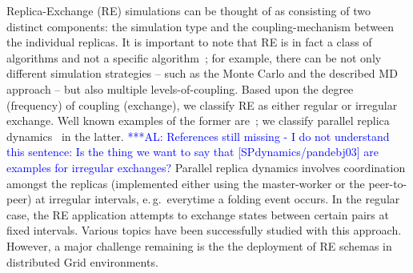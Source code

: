 \documentclass[times, 10pt, twocolumn]{article}
\newcommand{\alnote}[1]{ {\textcolor{blue} { ***AL: #1 }}}
\newcommand{\alnote}[1]{}
\begin{document}
Replica-Exchange (RE) simulations can be thought of as consisting of
two distinct components: the simulation type and the
coupling-mechanism between the individual replicas.  It is important
to note that RE is in fact a class of algorithms and not a specific
algorithm~\cite{dpa_surveypaper}; for example, there can be not only
different simulation strategies -- such as the Monte Carlo and 
the described MD approach
-- but also multiple levels-of-coupling.  Based upon the degree
(frequency) of coupling (exchange), we classify RE as either regular
or irregular exchange. Well known examples of the former
are~\cite{hansmann,Sugita:1999rm}; we classify parallel replica
dynamics~\cite{SPdynamics,pande_bj03} in the latter. 
\alnote{References still missing - I do not understand this sentence: 
Is the thing we want to say that [SPdynamics/pandebj03] are examples for irregular exchanges?}
Parallel replica
dynamics involves coordination amongst the replicas (implemented
either using the master-worker or the peer-to-peer) at irregular
intervals, e.\,g.\ everytime a folding event occurs. In the regular case, 
the RE application attempts to exchange states between certain
pairs at fixed intervals. Various topics have been successfully studied with this
approach. However, a major challenge remaining is the the deployment of RE schemas in
distributed Grid environments. 
          




\label{sec:migol}
\end{document}
